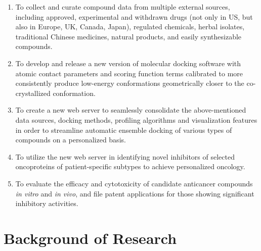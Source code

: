 \documentclass[a4paper,12pt]{article}
\begin{document}
\begin{enumerate}
  \item To collect and curate compound data from multiple external sources, including approved, experimental and withdrawn drugs (not only in US, but also in Europe, UK, Canada, Japan), regulated chemicals, herbal isolates, traditional Chinese medicines, natural products, and easily synthesizable compounds.\label{objective:cdata}
  \item To develop and release a new version of molecular docking software with atomic contact parameters and scoring function terms calibrated to more consistently produce low-energy conformations geometrically closer to the co-crystallized conformation.\label{objective:idock}
  \item To create a new web server to seamlessly consolidate the above-mentioned data sources, docking methods, profiling algorithms and visualization features in order to streamline automatic ensemble docking of various types of compounds on a personalized basis.\label{objective:edock}
  \item To utilize the new web server in identifying novel inhibitors of selected oncoproteins of patient-specific subtypes to achieve personalized oncology.\label{objective:edockapp}
  \item To evaluate the efficacy and cytotoxicity of candidate anticancer compounds \textit{in vitro} and \textit{in vivo}, and file patent applications for those showing significant inhibitory activities.\label{objective:wetval}
\end{enumerate}

\section*{Background of Research}
\end{document}
